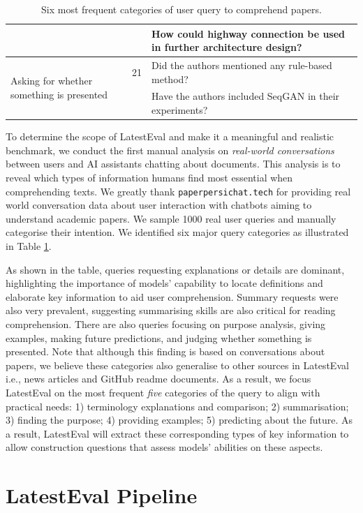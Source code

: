 \documentclass[letterpaper]{article} %
\begin{document}
\begin{table}[t]
\begin{tabular}{p{4cm}rp{10cm}}
        && How could highway connection be used in further architecture design? \\
        \midrule
        \multirow{2}{4cm}{Asking for whether something is presented} & 21 & Did the authors mentioned any rule-based method? \\
        && Have the authors included SeqGAN in their experiments? \\ 
    \bottomrule
    \end{tabular}
    \caption{Six most frequent categories of user query to comprehend papers.}
    \label{tab:scope}
\end{table}

To determine the scope of LatestEval and make it a meaningful and realistic benchmark, we conduct the first manual analysis on \textit{real-world conversations} between users and AI assistants chatting about documents. This analysis is to reveal which types of information humans find most essential when comprehending texts. We greatly thank \texttt{paperpersichat.tech} for providing real world conversation data about user interaction with chatbots aiming to understand academic papers. We sample 1000 real user queries and manually categorise their intention. We identified six major query categories as illustrated in Table \ref{tab:scope}.

As shown in the table, queries requesting explanations or details are dominant, highlighting the importance of models' capability to locate definitions and elaborate key information to aid user comprehension. Summary requests were also very prevalent, suggesting summarising skills are also critical for reading comprehension. There are also queries focusing on purpose analysis, giving examples, making future predictions, and judging whether something is presented. Note that although this finding is based on conversations about papers, we believe these categories also generalise to other sources in LatestEval i.e., news articles and GitHub readme documents. As a result, we focus LatestEval on the most frequent \textit{five} categories of the query to align with practical needs: 1) terminology explanations and comparison; 2) summarisation; 3) finding the purpose; 4) providing examples; 5) predicting about the future. As a result, LatestEval will extract these corresponding types of key information to allow construction questions that assess models' abilities on these aspects.

\section{LatestEval Pipeline}
\end{document}
